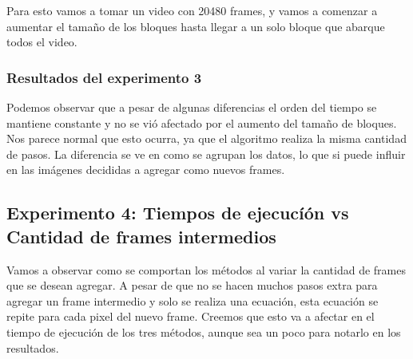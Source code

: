 \par Para esto vamos a tomar un video con 20480 frames, y vamos a comenzar a aumentar el tama\~no de los bloques hasta llegar a un solo bloque que abarque todos el video.


\subsubsection{Resultados del experimento 3}
\begin{figure}[ht]
	\begin{center}
	\end{center}
\end{figure}
\par Podemos observar que a pesar de algunas diferencias el orden del tiempo se mantiene constante y no se vi\'o afectado por el aumento del tama\~no de bloques. Nos parece normal que esto ocurra, ya que el algoritmo realiza la misma cantidad de pasos. La diferencia se ve en como se agrupan los datos, lo que si puede influir en las im\'agenes decididas a agregar como nuevos frames.



\subsection{Experimento 4: Tiempos de ejecucí\'on vs Cantidad de frames intermedios}
\par Vamos a observar como se comportan los m\'etodos al variar la cantidad de frames que se desean agregar. A pesar de que no se hacen muchos pasos extra para agregar un frame intermedio y solo se realiza una ecuaci\'on, esta ecuaci\'on se repite para cada pixel del nuevo frame. Creemos que esto va a afectar en el tiempo de ejecuci\'on de los tres m\'etodos, aunque sea un poco para notarlo en los resultados.


